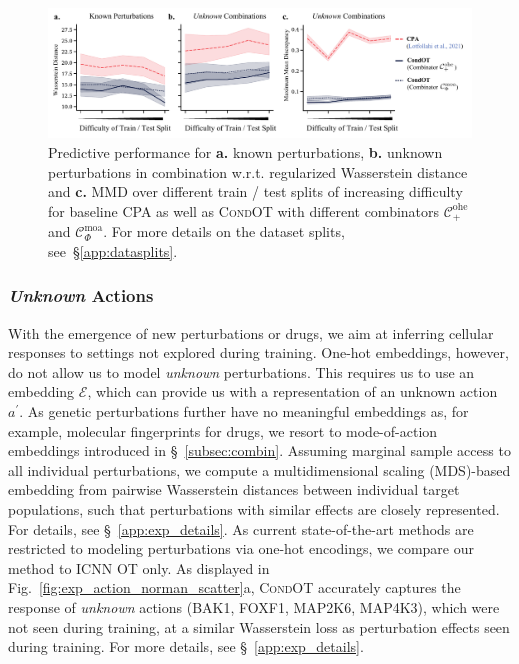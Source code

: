 \begin{figure}[t]
    \includegraphics[width=1.15\textwidth]{figures/fig_action_comb_comparison_metrics.pdf}
    \caption{Predictive performance for \textbf{a.} known perturbations, \textbf{b.} unknown perturbations in combination w.r.t. regularized Wasserstein distance and \textbf{c.} MMD over different train / test splits of increasing difficulty for baseline \textsc{CPA} as well as \textsc{CondOT} with different combinators $\mathcal{C}^\text{ohe}_+$ and $\mathcal{C}^\text{moa}_\Phi$. For more details on the dataset splits, see~\S\ref{app:datasplits}.}
    \label{fig:exp_action_norman_line}
\end{figure}


\subsubsection{\textit{Unknown} Actions} \label{sec:eval_action_unknown}
\vspace{-5pt}

 With the emergence of new perturbations or drugs, we aim at inferring cellular responses to settings not explored during training.
One-hot embeddings, however, do not allow us to model \emph{unknown} perturbations. 
This requires us to use an embedding $\mathcal{E}$, which can provide us with a representation of an unknown action $a^\prime$.
As genetic perturbations further have no meaningful embeddings as, for example, molecular fingerprints for drugs, we resort to mode-of-action embeddings introduced in \S~\ref{subsec:combin}. Assuming marginal sample access to all individual perturbations, we compute a multidimensional scaling (MDS)-based embedding from pairwise Wasserstein distances between individual target populations, such that perturbations with similar effects are closely represented. For details, see \S~\ref{app:exp_details}.
As current state-of-the-art methods are restricted to modeling perturbations via one-hot encodings, we compare our method to \textsc{ICNN OT} only. As displayed in Fig.~\ref{fig:exp_action_norman_scatter}a, \textsc{CondOT} accurately captures the response of \emph{unknown} actions (BAK1, FOXF1, MAP2K6, MAP4K3), which were not seen during training, at a similar Wasserstein loss as perturbation effects seen during training. For more details, see \S~\ref{app:exp_details}.
 
